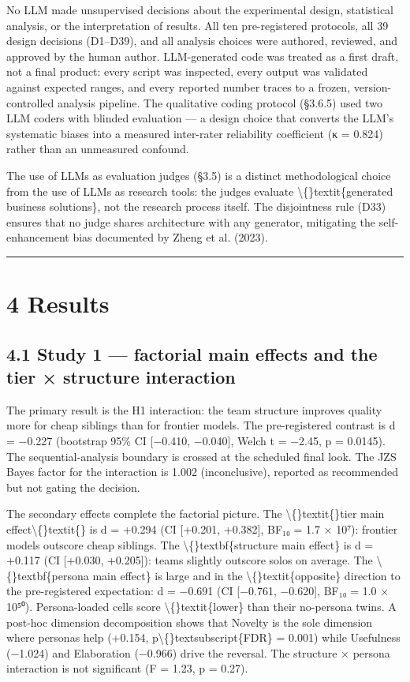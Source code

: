 \documentclass[11pt,a4paper]{article}
\begin{document}
No LLM made unsupervised decisions about the experimental design,
statistical analysis, or the interpretation of results. All ten
pre-registered protocols, all 39 design decisions (D1–D39), and all
analysis choices were authored, reviewed, and approved by the human
author. LLM-generated code was treated as a first draft, not a final
product: every script was inspected, every output was validated against
expected ranges, and every reported number traces to a frozen,
version-controlled analysis pipeline. The qualitative coding protocol
(§3.6.5) used two LLM coders with blinded evaluation — a design choice
that converts the LLM's systematic biases into a measured inter-rater
reliability coefficient (κ = 0.824) rather than an unmeasured confound.

The use of LLMs as evaluation judges (§3.5) is a distinct methodological
choice from the use of LLMs as research tools: the judges evaluate
\textbackslash\{\}textit\{generated business solutions\}, not the research process itself. The
disjointness rule (D33) ensures that no judge shares architecture with
any generator, mitigating the self-enhancement bias documented by
Zheng et al. (2023).

\hrule


\section{4 Results}

\subsection{4.1 Study 1 — factorial main effects and the tier × structure interaction}

The primary result is the H1 interaction: the team structure improves
quality more for cheap siblings than for frontier models. The
pre-registered contrast is d = −0.227 (bootstrap 95\% CI [−0.410,
−0.040], Welch t = −2.45, p = 0.0145). The sequential-analysis
boundary is crossed at the scheduled final look. The JZS Bayes factor
for the interaction is 1.002 (inconclusive), reported as recommended
but not gating the decision.

The secondary effects complete the factorial picture. The \textbackslash\{\}textit\{\}tier
main effect\textbackslash\{\}textit\{\} is d = +0.294 (CI [+0.201, +0.382], BF₁₀ = 1.7 × 10⁷):
frontier models outscore cheap siblings. The \textbackslash\{\}textbf\{structure main effect\}
is d = +0.117 (CI [+0.030, +0.205]): teams slightly outscore solos on
average. The \textbackslash\{\}textbf\{persona main effect\} is large and in the \textbackslash\{\}textit\{opposite\}
direction to the pre-registered expectation: d = −0.691 (CI [−0.761,
−0.620], BF₁₀ = 1.0 × 10⁵⁰). Persona-loaded cells score \textbackslash\{\}textit\{lower\} than
their no-persona twins. A post-hoc dimension decomposition shows that
Novelty is the sole dimension where personas help (+0.154, p\textbackslash\{\}textsubscript\{FDR\} =
0.001) while Usefulness (−1.024) and Elaboration (−0.966) drive the
reversal. The structure × persona interaction is not significant (F =
1.23, p = 0.27).
\end{document}
